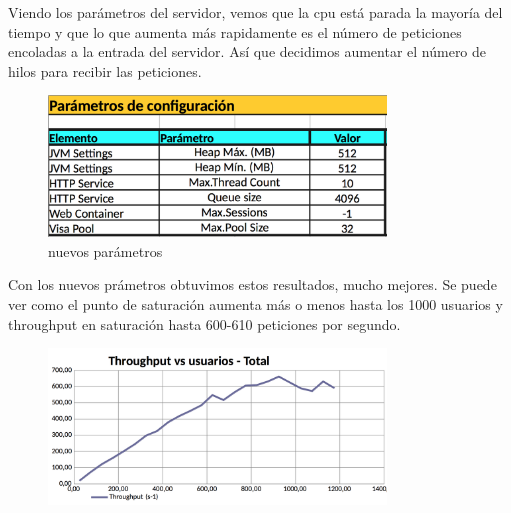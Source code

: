 \documentclass[a4paper, 10pt]{article}
\begin{document}
	Viendo los parámetros del servidor, vemos que la cpu está parada la mayoría del tiempo y que lo que aumenta más rapidamente es el número de peticiones encoladas a la entrada del servidor. Así que decidimos aumentar el número de hilos para recibir las peticiones.

	\pagebreak

	\begin{figure}[hbtp]
	 	\centering
	 	\includegraphics[width=0.8\textwidth]{../../p2/pantallazos/ej9_param.png}
	 	\caption{nuevos parámetros}
	\end{figure}

	Con los nuevos prámetros obtuvimos estos resultados, mucho mejores. Se puede ver como el punto de saturación aumenta más o menos hasta los 1000 usuarios y throughput en saturación hasta 600-610 peticiones por segundo.

	\begin{figure}[hbtp]
	 	\centering
	 	\includegraphics[width=0.8\textwidth]{../../p2/pantallazos/ej9b.png}
	\end{figure}
\end{document}
